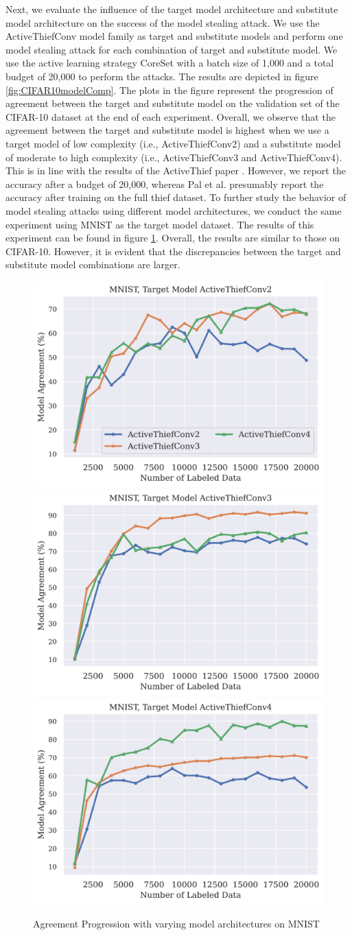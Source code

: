 Next, we evaluate the influence of the target model architecture and substitute model architecture on the success of the model stealing attack. We use the ActiveThiefConv model
family as target and substitute models and perform one model stealing attack for each combination of target and substitute model. We use the active learning strategy CoreSet
with a batch size of 1,000 and a total budget of 20,000 to perform the attacks. The results are depicted in figure \ref{fig:CIFAR10modelComp}. The plots in the figure represent
the progression of agreement between the target and substitute model on the validation set of the CIFAR-10 dataset at the end of each experiment. Overall, we observe that the
agreement between the target and substitute model is highest when we use a target model of low complexity (i.e., ActiveThiefConv2) and a substitute model of moderate to high
complexity (i.e., ActiveThiefConv3 and ActiveThiefConv4). This is in line with the results of the ActiveThief paper \cite{pal2020activethief}. However, we report the accuracy
after a budget of 20,000, whereas Pal et al. presumably report the accuracy after training on the full thief dataset. To further study the behavior of model stealing attacks
using different model architectures, we conduct the same experiment using MNIST as the target model dataset. The results of this experiment can be found in figure 
\ref{fig:MNISTmodelComp}. Overall, the results are similar to those on CIFAR-10. However, it is evident that the discrepancies between
the target and substitute model combinations are larger. \par

\begin{figure}[!htb]
    \centering
    \includegraphics[width=0.32\linewidth]{images/MSInsights/mnist_act2.png} \hfill
    \includegraphics[width=0.32\linewidth]{images/MSInsights/mnist_act3.png} \hfill
    \includegraphics[width=0.32\linewidth]{images/MSInsights/mnist_act4.png}
    \caption{Agreement Progression with varying model architectures on MNIST}
    \label{fig:MNISTmodelComp}
\end{figure}


